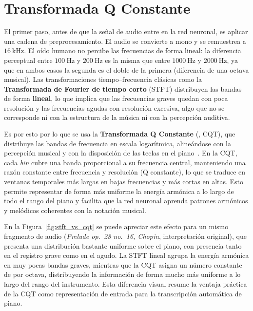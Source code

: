 \documentclass[11pt,spanish,listoffigures,listoftables]{tfgetsinf}
\begin{document}
\section{Transformada Q Constante}
\label{sec:cqt}

El primer paso, antes de que la señal de audio entre en la red neuronal, es aplicar una cadena de preprocesamiento. El audio se convierte a mono
y se remuestrea a $16~\mathrm{kHz}$. El oído humano no percibe las frecuencias de forma lineal: la diferencia perceptual entre $100~\mathrm{Hz}$
y $200~\mathrm{Hz}$ es la misma que entre $1000~\mathrm{Hz}$ y $2000~\mathrm{Hz}$, ya que en ambos casos la segunda es el doble de la primera
(diferencia de una octava musical). Las transformaciones tiempo--frecuencia clásicas como la \textbf{Transformada de Fourier de tiempo corto}
(STFT) distribuyen las bandas de forma \textbf{lineal}, lo que implica que las frecuencias graves quedan con poca resolución y las frecuencias agudas
con resolución excesiva, algo que no se corresponde ni con la estructura de la música ni con la percepción auditiva.

Es por esto por lo que se usa la \textbf{Transformada Q Constante} (, CQT), que distribuye las
bandas de frecuencia en escala logarítmica, alineándose con la percepción musical y con la disposición de las teclas en el piano~\cite{wang2025mftfilm}. En la
CQT, cada \textit{bin} cubre una banda proporcional a su frecuencia central, manteniendo una razón constante entre frecuencia y resolución (Q constante), 
lo que se traduce en ventanas temporales más largas en bajas frecuencias y más cortas en altas. Esto
permite representar de forma más uniforme la energía armónica a lo largo de todo el rango del piano y facilita que la red neuronal aprenda
patrones armónicos y melódicos coherentes con la notación musical.

En la Figura~\ref{fig:stft_vs_cqt} se puede apreciar este efecto para un mismo fragmento de audio (\textit{Prelude op.\ 28 no.\ 16, Chopin},
interpretación original), que presenta una distribución bastante uniforme sobre el piano, con presencia tanto en el registro grave como en el
agudo. La STFT lineal agrupa la energía armónica en muy pocas bandas graves, mientras que la CQT asigna un número
constante de  por octava, distribuyendo la información de forma mucho más uniforme a lo largo del rango del
instrumento. Esta diferencia visual resume la ventaja práctica de la CQT como representación de entrada para la transcripción
automática de piano.
\end{document}
